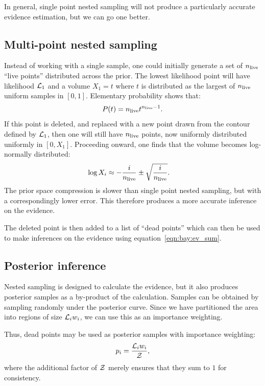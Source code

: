 In general, single point nested sampling will not produce a particularly accurate evidence estimation, but we can go one better.


\subsection{Multi-point nested sampling}
Instead of working with a single sample, one could initially generate a set of \(n_{\mathrm{live}}\) ``live points'' distributed across the prior. The lowest likelihood point will have likelihood \(\mathcal{L}_1\) and a volume \(X_1 = t\) where \(t\) is distributed as the largest of \(n_{\mathrm{live}}\) uniform samples in \([0,1]\). Elementary probability shows that:
\begin{equation}
  P(t) = n_{\mathrm{live}} t^{n_{\mathrm{live}}-1}.
  \label{eqn:bay:t_prob}
\end{equation}
If this point is deleted, and replaced with a new point drawn from the contour defined by \(\mathcal{L}_1\), then one will still have \(n_{\mathrm{live}}\) points, now uniformly distributed uniformly in \([0,X_1]\). Proceeding onward, one finds that the volume becomes log-normally distributed:
\begin{align}
  \log X_i  &\approx -\frac{i}{n_{\mathrm{live}}} \pm \sqrt{\frac{i}{n_{\mathrm{live}}}}.
  \label{eqn:pc:X_full}
\end{align}
The prior space compression is slower than single point nested sampling, but with a correspondingly lower error. This therefore produces a more accurate inference on the evidence.

The deleted point is then added to a list of ``dead points'' which can then be used to make inferences on the evidence using equation~\eqref{eqn:bay:ev_sum}.


\subsection{Posterior inference}
Nested sampling is designed to calculate the evidence, but it also produces posterior samples as a by-product of the calculation. Samples can be obtained by sampling randomly under the posterior curve.
Since we have partitioned the area into regions of size \(\mathcal{L}_i w_i\), we can use this as an importance weighting.

Thus, dead points may be used as posterior samples with importance weighting:
\begin{equation}
  p_i = \frac{\mathcal{L}_i w_i}{\mathcal{Z}},
  \label{eqn:bay:posterior_weight}
\end{equation}
where the additional factor of \(\mathcal{Z}\) merely ensures that they sum to \(1\) for consistency.




